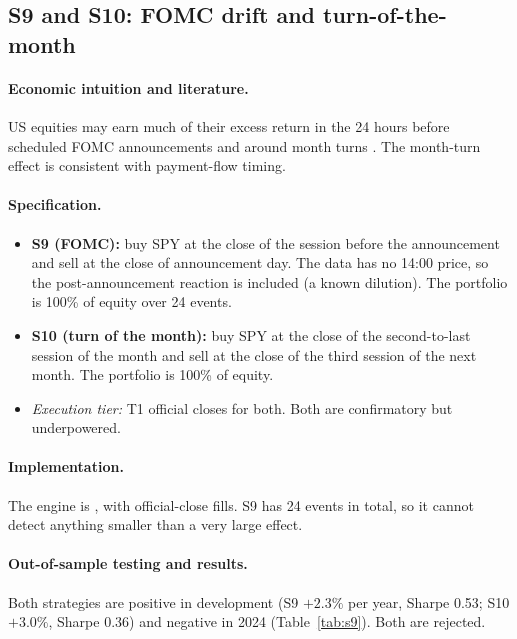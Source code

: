 \documentclass[../main.tex]{subfiles}
\begin{document}
\subsection{S9 and S10: FOMC drift and turn-of-the-month}\label{sec:s9}

\paragraph{Economic intuition and literature.}
US equities may earn much of their excess return in the 24 hours before scheduled FOMC announcements \citep{lucca2015} and around month turns \citep{ariel1987,lakonishok1988}. The month-turn effect is consistent with payment-flow timing.

\paragraph{Specification.}
\begin{itemize}
\item \textbf{S9 (FOMC):} buy SPY at the close of the session before the announcement and sell at the close of announcement day. The data has no 14:00 price, so the post-announcement reaction is included (a known dilution). The portfolio is 100\% of equity over 24 events.
\item \textbf{S10 (turn of the month):} buy SPY at the close of the second-to-last session of the month and sell at the close of the third session of the next month. The portfolio is 100\% of equity.
\item \emph{Execution tier:} T1 official closes for both. Both are confirmatory but underpowered.
\end{itemize}

\paragraph{Implementation.}
The engine is , with official-close fills. S9 has 24 events in total, so it cannot detect anything smaller than a very large effect.

\paragraph{Out-of-sample testing and results.}
Both strategies are positive in development (S9 $+2.3\%$ per year, Sharpe 0.53; S10 $+3.0\%$, Sharpe 0.36) and negative in 2024 (Table~\ref{tab:s9}). Both are rejected.
\end{document}
